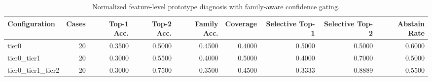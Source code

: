 \begin{table}[t]
\centering
\caption{Normalized feature-level prototype diagnosis with family-aware confidence gating.}
\label{tab:dice_stressor_hierarchical_diagnosis}
\footnotesize
\begin{tabular}{lrrrrrrrr}
\toprule
Configuration & Cases & Top-1 Acc. & Top-2 Acc. & Family Acc. & Coverage & Selective Top-1 & Selective Top-2 & Abstain Rate \\
\midrule
tier0 & 20 & 0.3500 & 0.5000 & 0.4500 & 0.4000 & 0.5000 & 0.5000 & 0.6000 \\
tier0_tier1 & 20 & 0.3000 & 0.5500 & 0.4000 & 0.5000 & 0.4000 & 0.7000 & 0.5000 \\
tier0_tier1_tier2 & 20 & 0.3000 & 0.7500 & 0.3500 & 0.4500 & 0.3333 & 0.8889 & 0.5500 \\
\bottomrule
\end{tabular}

\end{table}
